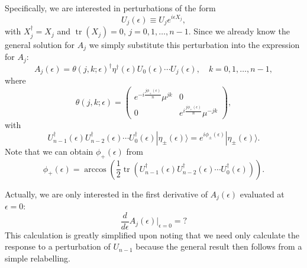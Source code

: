 \documentclass[12pt]{amsart}
\newcommand{\tr}{\operatorname{tr}}
\theoremstyle{definition}
\theoremstyle{remark}
\numberwithin{equation}{section}
\begin{document}
Specifically, we are interested in perturbations of the form
\begin{equation}
	U_j(\epsilon) \equiv U_j e^{i\epsilon X_j},
\end{equation}
with $X^\dag_j = X_j$ and $\tr(X_j) = 0$, $j = 0, 1, \ldots, n-1$. Since we already know the general solution for $A_j$ we simply substitute this perturbation into the expression for $A_j$:
\begin{equation}
	A_j(\epsilon) = \theta(j,k; \epsilon)^\dag \eta^\dag(\epsilon) U_0(\epsilon) \cdots U_{j}(\epsilon), \quad k = 0, 1, \ldots, n-1,
\end{equation}
where 
\begin{equation}	
	\theta(j,k; \epsilon) = \begin{pmatrix} e^{-i\frac{j\phi_{+}(\epsilon)}{n}}\mu^{jk} & 0 \\ 0 &  e^{i\frac{j\phi_{+}(\epsilon)}{n}}\mu^{-jk}\end{pmatrix},
\end{equation}
with 
\begin{equation}
	U_{n-1}^\dag(\epsilon) U_{n-2}^\dag(\epsilon) \cdots U_0^\dag(\epsilon) |\eta_{\pm}(\epsilon)\rangle = e^{i\phi_{\pm}(\epsilon)}|\eta_{\pm}(\epsilon)\rangle.
\end{equation}
Note that we can obtain $\phi_+(\epsilon)$ from
\begin{equation}
	\phi_+(\epsilon) = \arccos\left(\frac12 \tr(U_{n-1}^\dag(\epsilon) U_{n-2}^\dag(\epsilon) \cdots U_0^\dag(\epsilon))\right).
\end{equation}

Actually, we are only interested in the first derivative of $A_j(\epsilon)$ evaluated at $\epsilon = 0$:
\begin{equation}
	\frac{d}{d\epsilon} A_j(\epsilon) \bigg|_{\epsilon = 0} = ?
\end{equation}
This calculation is greatly simplified upon noting that we need only calculate the response to a perturbation of $U_{n-1}$ because the general result then follows from a simple relabelling.
\end{document}
